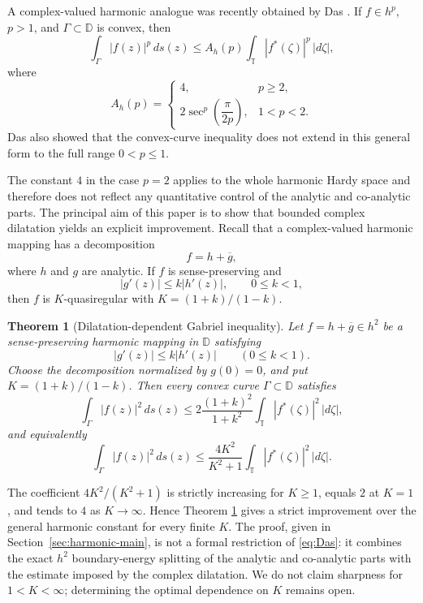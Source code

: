 \documentclass[11pt]{article}
\newtheorem{theorem}{Theorem}[section]
\theoremstyle{definition}
\theoremstyle{remark}
\newcommand{\D}{\mathbb D}
\newcommand{\T}{\mathbb T}
\newcommand{\ds}{\,ds}
\begin{document}
A complex-valued harmonic analogue was recently obtained by Das \cite{Das2025}. If $f\in h^p$, $p>1$, and $\Gamma\subset\D$ is convex, then
\begin{equation}\label{eq:Das}
   \int_\Gamma |f(z)|^p\ds(z)
   \le A_h(p)\int_\T |f^*(\zeta)|^p\,|d\zeta|,
\end{equation}
where
\begin{equation}\label{eq:Ah}
   A_h(p)=
   \begin{cases}
      4, & p\ge2,\\[3pt]
      2\sec^p\!\left(\dfrac{\pi}{2p}\right), & 1<p<2.
   \end{cases}
\end{equation}
Das also showed that the convex-curve inequality does not extend in this general form to the full range $0<p\le1$.

The constant $4$ in the case $p=2$ applies to the whole harmonic Hardy space and therefore does not reflect any quantitative control of the analytic and co-analytic parts. The principal aim of this paper is to show that bounded complex dilatation yields an explicit improvement. Recall that a complex-valued harmonic mapping has a decomposition
\[
   f=h+\overline g,
\]
where $h$ and $g$ are analytic. If $f$ is sense-preserving and
\[
   |g'(z)|\le k|h'(z)|, \qquad 0\le k<1,
\]
then $f$ is $K$-quasiregular with $K=(1+k)/(1-k)$.

\begin{theorem}[Dilatation-dependent Gabriel inequality]\label{thm:main}
Let $f=h+\overline g\in h^2$ be a sense-preserving harmonic mapping in $\D$ satisfying
\[
   |g'(z)|\le k|h'(z)|\qquad (0\le k<1).
\]
Choose the decomposition normalized by $g(0)=0$, and put $K=(1+k)/(1-k)$. Then every convex curve $\Gamma\subset\D$ satisfies
\begin{equation}\label{eq:main-k}
   \int_\Gamma |f(z)|^2\ds(z)
   \le 2\frac{(1+k)^2}{1+k^2}
      \int_\T |f^*(\zeta)|^2\,|d\zeta|,
\end{equation}
and equivalently
\begin{equation}\label{eq:main-K}
   \int_\Gamma |f(z)|^2\ds(z)
   \le \frac{4K^2}{K^2+1}
      \int_\T |f^*(\zeta)|^2\,|d\zeta|.
\end{equation}
\end{theorem}

The coefficient $4K^2/(K^2+1)$ is strictly increasing for $K\ge1$, equals $2$ at $K=1$, and tends to $4$ as $K\to\infty$. Hence Theorem \ref{thm:main} gives a strict improvement over the general harmonic constant for every finite $K$. The proof, given in Section~\ref{sec:harmonic-main}, is not a formal restriction of \eqref{eq:Das}: it combines the exact $h^2$ boundary-energy splitting of the analytic and co-analytic parts with the estimate imposed by the complex dilatation. We do not claim sharpness for $1<K<\infty$; determining the optimal dependence on $K$ remains open.
\end{document}
